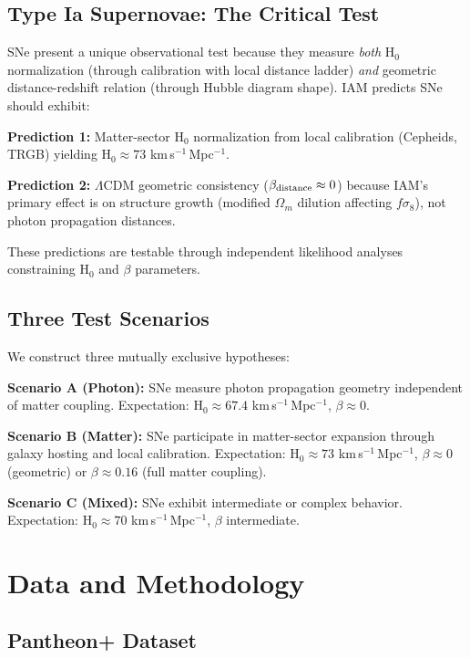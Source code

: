 \documentclass[twocolumn,superscriptaddress,prd,amsmath,amssymb]{revtex4-2}
\begin{document}
\subsection{Type Ia Supernovae: The Critical Test}

SNe present a unique observational test because they measure \textit{both} H$_0$ normalization (through calibration with local distance ladder) \textit{and} geometric distance-redshift relation (through Hubble diagram shape). IAM predicts SNe should exhibit:

\textbf{Prediction 1:} Matter-sector H$_0$ normalization from local calibration (Cepheids, TRGB) yielding H$_0 \approx 73$ km\,s$^{-1}$\,Mpc$^{-1}$.

\textbf{Prediction 2:} $\Lambda$CDM geometric consistency ($\beta_{\rm distance} \approx 0$) because IAM's primary effect is on structure growth (modified $\Omega_m$ dilution affecting $f\sigma_8$), not photon propagation distances.

These predictions are testable through independent likelihood analyses constraining H$_0$ and $\beta$ parameters.

\subsection{Three Test Scenarios}

We construct three mutually exclusive hypotheses:

\textbf{Scenario A (Photon):} SNe measure photon propagation geometry independent of matter coupling. Expectation: H$_0 \approx 67.4$ km\,s$^{-1}$\,Mpc$^{-1}$, $\beta \approx 0$.

\textbf{Scenario B (Matter):} SNe participate in matter-sector expansion through galaxy hosting and local calibration. Expectation: H$_0 \approx 73$ km\,s$^{-1}$\,Mpc$^{-1}$, $\beta \approx 0$ (geometric) or $\beta \approx 0.16$ (full matter coupling).

\textbf{Scenario C (Mixed):} SNe exhibit intermediate or complex behavior. Expectation: H$_0 \approx 70$ km\,s$^{-1}$\,Mpc$^{-1}$, $\beta$ intermediate.

\section{Data and Methodology}

\subsection{Pantheon+ Dataset}
\end{document}
